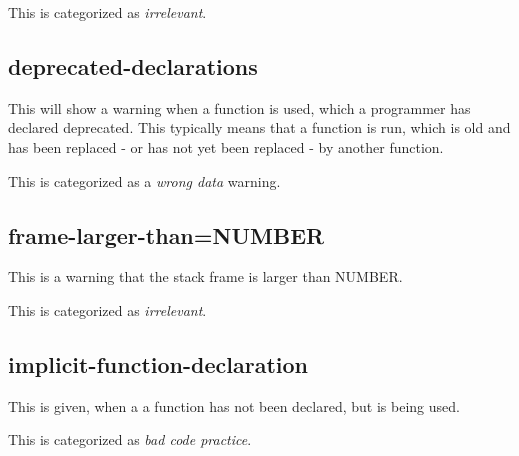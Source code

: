 \documentclass[a4paper,11pt]{report}
\begin{document}
This is categorized as \emph{irrelevant}.


            \subsection*{deprecated-declarations}
This will show a warning when a function is used, which a programmer has 
declared deprecated. This typically means that a function is run, which is old
and has been replaced - or has not yet been replaced - by another function.

This is categorized as a \emph{wrong data} warning.


            \subsection*{frame-larger-than=NUMBER}
This is a warning that the stack frame is larger than NUMBER.

This is categorized as \emph{irrelevant}.


            \subsection*{implicit-function-declaration}
This is given, when a a function has not been declared, but is being used.

This is categorized as \emph{bad code practice}.


            %


            %
\end{document}
